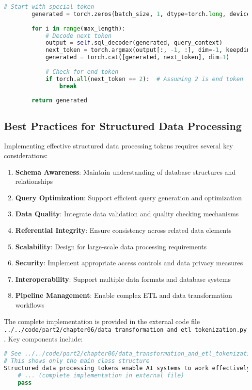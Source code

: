 \begin{lstlisting}[language=Python, caption=Natural language to SQL generation system]
        # Start with special token
        generated = torch.zeros(batch_size, 1, dtype=torch.long, device=device)
        
        for i in range(max_length):
            # Decode next token
            output = self.sql_decoder(generated, query_context)
            next_token = torch.argmax(output[:, -1, :], dim=-1, keepdim=True)
            generated = torch.cat([generated, next_token], dim=1)
            
            # Check for end token
            if torch.all(next_token == 2):  # Assuming 2 is end token
                break
        
        return generated
\end{lstlisting}

\subsection{Best Practices for Structured Data Processing}

Implementing effective structured data processing tokens requires several key considerations:

\begin{enumerate}
\item \textbf{Schema Awareness}: Maintain understanding of database structures and relationships
\item \textbf{Query Optimization}: Support efficient query generation and optimization
\item \textbf{Data Quality}: Integrate data validation and quality checking mechanisms
\item \textbf{Referential Integrity}: Ensure consistency across related data elements
\item \textbf{Scalability}: Design for large-scale data processing requirements
\item \textbf{Security}: Implement appropriate access controls and data privacy measures
\item \textbf{Interoperability}: Support multiple data formats and database systems
\item \textbf{Pipeline Management}: Enable complex ETL and data transformation workflows
\end{enumerate}
The complete implementation is provided in the external code file \texttt{../../code/part2/chapter06/data\_transformation\_and\_etl\_tokenization.py}. Key components include:

\begin{lstlisting}[language=Python, caption=Core structure (see external file for complete implementation)]
# See ../../code/part2/chapter06/data_transformation_and_etl_tokenization.py for the complete implementation
# This shows only the main class structure
Structured data processing tokens enable AI systems to work effectively with databases, data warehouses, and complex data processing pipelines, supporting automated database design, query optimization, and intelligent data transformation while maintaining data integrity and performance requirements.
    # ... (complete implementation in external file)
    pass
\end{lstlisting}